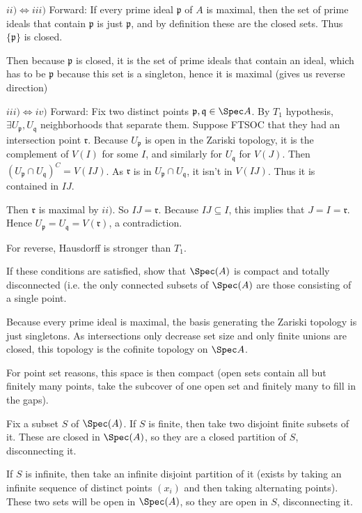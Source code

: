 \documentclass[a4paper]{exam}
\begin{document}
\begin{questions}
\begin{solution}
	$ii)\iff iii) $ Forward: If every prime ideal $\mathfrak{p} $ of $A $ is maximal, then the set of prime ideals that contain $\mathfrak{p} $ is just $\mathfrak{p} $, and by definition these are the closed sets.
	Thus $\{\mathfrak{p}\}   $ is closed.

	Then because ${\mathfrak{p}} $ is closed, it is the set of prime ideals that contain an ideal, which has to be $\mathfrak{p}$ because this set is a singleton, hence it is maximal (gives us reverse direction)

	$iii) \iff iv) $ Forward: Fix two distinct points $\mathfrak{p},\mathfrak{q} \in \Spec A $.
	By $T_{1} $ hypothesis, $\exists U_ \mathfrak{p}, U_{\mathfrak{q}}$ neighborhoods that separate them.
	Suppose FTSOC that they had an intersection point $\mathfrak{r} $.
	Because $U_{\mathfrak{p}} $ is open in the Zariski topology, it is the complement of $V(I) $ for some $I $, and similarly for $U_{\mathfrak{q}} $ for $V(J) $.
	Then $ (U_{\mathfrak{p}} \cap U_{\mathfrak{q}})^C = V(IJ)$.
	As $\mathfrak{r} $ is in $U_{\mathfrak{p}} \cap U_{\mathfrak{q}}$, it isn't in $V(IJ) $.
	Thus it is contained in $IJ$.

	Then $\mathfrak{r} $ is maximal by $ii) $.
	So $IJ = \mathfrak{r} $.
	Because $IJ \subseteq I $, this implies that $J = I = \mathfrak{r}$.
	Hence $U_{\mathfrak{p}} = U_{\mathfrak{q}} = V(\mathfrak{r})$, a contradiction.

	For reverse, Hausdorff is stronger than $T_{1} $.
\end{solution}
If these conditions are satisfied, show that $\Spec(A) $ is compact and totally disconnected (i.e. the only connected subsets of $\Spec(A) $ are those consisting of a single point.
\begin{solution}
	Because every prime ideal is maximal, the basis generating the Zariski topology is just singletons.
	As intersections only decrease set size and only finite unions are closed, this topology is the cofinite topology on $\Spec A $.

	For point set reasons, this space is then compact (open sets contain all but finitely many points, take the subcover of one open set and finitely many to fill in the gaps).

	Fix a subset $S $ of $\Spec(A) $.
	If $S $ is finite, then take two disjoint finite subsets of it.
	These are closed in $\Spec(A) $, so they are a closed partition of $S $, disconnecting it.

	If $S $ is infinite, then take an infinite disjoint partition of it (exists by taking an infinite sequence of distinct points $(x_i) $ and then taking alternating points).
	These two sets will be open in $\Spec(A) $, so they are open in $S $, disconnecting it.
\end{solution}


\end{questions}
\end{document}
